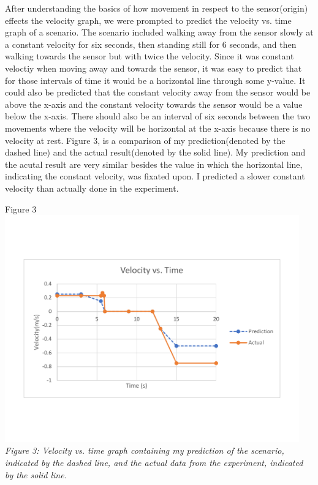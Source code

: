 \documentclass[aps,letterpaper,11pt]{revtex4}
\begin{document}
After understanding the basics of how movement in respect to the sensor(origin) effects the velocity graph, we were prompted to predict the velocity vs. time graph of a scenario. The scenario included walking away from the sensor slowly at a constant velocity for six seconds, then standing still for 6 seconds, and then walking towards the sensor but with twice the velocity. Since it was constant veloctiy when moving away and towards the sensor, it was easy to predict that for those intervals of time it would be a horizontal line through some y-value. It could also be predicted that the constant velocity away from the sensor would be above the x-axis and the constant velocity towards the sensor would be a value below the x-axis. There should also be an interval of six seconds between the two movements where the velocity will be horizontal at the x-axis because there is no velocity at rest. Figure 3, is a comparison of my prediction(denoted by the dashed line) and the actual result(denoted by the solid line). My prediction and the acutal result are very similar besides the value in which the horizontal line, indicating the constant velocity, was fixated upon. I predicted a slower constant velocity than actually done in the experiment. 

\begin{center}
Figure 3\\
\vspace{-10mm}
\includegraphics[width=5in]{velocityvstimeprediction.pdf}\\
\vspace{-10mm}
\textit{Figure 3: Velocity vs. time graph containing my prediction of the scenario, indicated by the dashed line, and the actual data from the experiment, indicated by the solid line.}
\end{center} 
\end{document}
